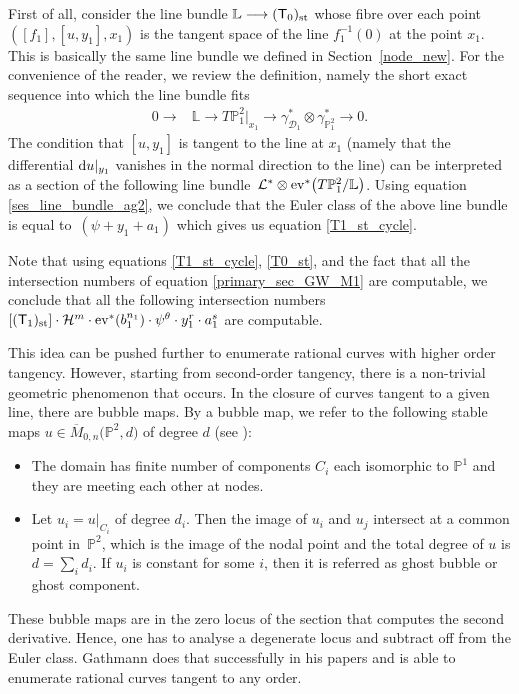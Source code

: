 \documentclass[pdftex]{sigma}
\numberwithin{equation}{section}
\begin{document}
First of all, consider the line bundle $\mathbb{L} \longrightarrow (\mathsf{T}_0)_{\textnormal{st}}$
whose fibre over each point $([f_1], [u, y_1], x_1)$ is the tangent space of the line $f_1^{-1}(0)$ at the point $x_1$.
This is basically the same line bundle we defined in Section~\ref{node_new}. For the convenience of the
reader, we review the definition,
namely the short exact sequence into which the line bundle fits
\begin{align}
0\longrightarrow & \mathbb{L} \longrightarrow T \mathbb{P}^2_{1}|_{x_1} \longrightarrow \gamma_{\mathcal{D}_1}^*
\otimes \gamma_{\mathbb{P}^2_{1}}^*\longrightarrow 0. \label{ses_line_bundle_ag2}
\end{align}
The condition that $[u, y_1]$ is tangent to the line at $x_1$ (namely that the differential ${\rm d}u|_{y_1}$ vanishes in the
normal direction to the line) can be interpreted as a section of the following line bundle~$
\mathcal{L}^*\otimes {\rm ev}^*\bigl( T \mathbb{P}^2_{1}/\mathbb{L}\bigr)$.
Using equation \eqref{ses_line_bundle_ag2}, we conclude that the Euler class of the above line bundle is equal to~${(\psi+ y_1 + a_1)}$
which gives us equation \eqref{T1_st_cycle}.

Note that using equations \eqref{T1_st_cycle}, \eqref{T0_st}, and the fact that all the intersection numbers of equation
\eqref{primary_sec_GW_M1} are computable, we conclude that all the following intersection numbers
$
[(\mathsf{T}_1)_{\textnormal{st}}]\cdot \mathcal{H}^m \cdot {\rm ev}^*(b_1^{n_1})
\cdot \psi^{\theta}\cdot y_1^{r}\cdot a_1^{s}
$
are computable.

This idea can be pushed further to enumerate rational curves with higher order tangency.
However, starting from second-order tangency, there is a non-trivial geometric phenomenon that occurs.
In the closure of curves tangent to a given line, there are
bubble maps. By a bubble map, we refer to the following stable maps $u \in \overline{M}_{0,n}\bigl(\mathbb{P}^2, d\bigr)$ of degree $d$ (see \cite[Section 5.1]{McSa}):
\begin{itemize}\itemsep=0pt
\item[$\bullet$] The domain has finite number of components $C_i$
each isomorphic to $\mathbb{P}^1$ and they are meeting each other at nodes.
\item[$\bullet$] Let $u_i = u|_{C_i}$ of degree $d_i$. Then the image of $u_i$ and $u_j$
intersect at a common point in~$\mathbb{P}^2$, which is the image of the nodal point and the total degree of $u$
is $d = \sum_{i} d_i$. If $u_i$ is constant for some $i$, then it is referred as ghost bubble or ghost component.
\end{itemize}
These bubble maps are in the zero locus
of the section that computes the second derivative. Hence, one has to analyse a degenerate locus and subtract off from the
Euler class. Gathmann does that successfully in his papers \cite{AnGaPhD,AnGa1,AnGa2}
and is able to enumerate rational curves tangent to any order.
\end{document}
